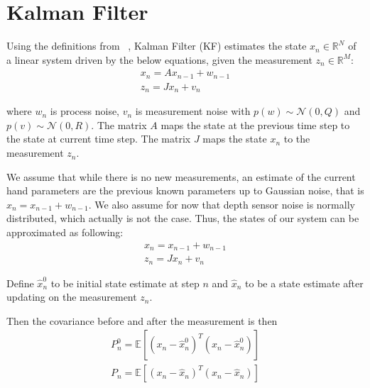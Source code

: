 \newpage
\appendix

\section{Kalman Filter} \label{app:kalman}

Using the definitions from ~\cite{welch1995introduction}, Kalman Filter (KF) estimates the state $x_n \in \mathbb{R}^N$ of a linear system driven by the below equations, given the measurement $z_n \in \mathbb{R}^M$:
\begin{align}
x_n = A x_{n - 1} +  w_{n - 1} \\
z_n = J x_n + v_n
\end{align}

where $w_n$ is process noise, $v_n$ is measurement noise with $p(w) \sim \mathcal{N}(0, Q)$ and $p(v) \sim \mathcal{N}(0, R)$. 
The matrix $A$ maps the state at the previous time step to the state at current time step. The matrix $J$ maps the state $x_n$ to the measurement $z_n$.

We assume that while  there is no new measurements, an estimate of the current hand parameters are the previous known parameters up to Gaussian noise, that is $x_n = x_{n-1} + w_{n-1}$. We also assume for now that depth sensor noise is normally distributed, which actually is not the case. Thus, the states of our system can be approximated as following:
\begin{align}
x_n = x_{n - 1} + w_{n - 1} \\
z_n = J x_n + v_n
\end{align}

Define $\hat{x}_n^0$ to be initial state estimate at step $n$ and $\hat{x}_n$ to be a state estimate after updating on the measurement $z_n$.

Then the covariance before and after the measurement is then 
\begin{align}
P_n^0=\mathbb{E}[(x_n - \hat{x}_n^0)^T(x_n - \hat{x}_n^0)]\\
P_n =\mathbb{E}[(x_n - \hat{x}_n)^T(x_n - \hat{x}_n)]
\end{align}

\begin{table}[!h] 
\centering
\caption{Time and measurement update for KF with $A$ equal to identity} 
\end{table}

